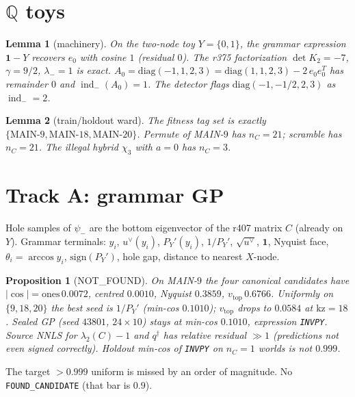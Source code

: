 \documentclass[11pt]{article}
\newtheorem{lemma}{Lemma}
\newtheorem{prop}{Proposition}
\theoremstyle{remark}
\newcommand{\indm}{\operatorname{ind}_{-}}
\newcommand{\Cmat}{C}
\begin{document}
\section{$\mathbb{Q}$ toys}

\begin{lemma}[machinery]\label{lem:q}
On the two-node toy $Y=\{0,1\}$, the grammar expression
$\mathbf{1}-Y$ recovers $e_0$ with cosine $1$ (residual $0$).
The r375 factorization $\det K_2=-7$, $\gamma=9/2$,
$\lambda_-=1$ is exact.
$A_0=\mathrm{diag}(-1,1,2,3)=\mathrm{diag}(1,1,2,3)-2\,e_0e_0^T$
has remainder $0$ and $\indm(A_0)=1$.
The detector flags $\mathrm{diag}(-1,-1/2,2,3)$ as
$\indm=2$.
\end{lemma}

\begin{lemma}[train/holdout ward]\label{lem:split}
The fitness tag set is exactly $\{\mathrm{MAIN}\text{-}9,
\mathrm{MAIN}\text{-}18,\mathrm{MAIN}\text{-}20\}$.
Permute of MAIN-$9$ has $n_C=21$; scramble has $n_C=21$.
The illegal hybrid $\chi_3$ with $a=0$ has $n_C=3$.
\end{lemma}

\section{Track A: grammar GP}

Hole samples of $\psi_-$ are the bottom eigenvector of the
r407 matrix $\Cmat$ (already on $Y$).
Grammar terminals: $y_i$, $u^\vee(y_i)$, $P_Y'(y_i)$,
$1/P_Y'$, $\sqrt{u^\vee}$, $\mathbf{1}$, Nyquist face,
$\theta_i=\arccos y_i$, $\mathrm{sign}(P_Y')$, hole gap,
distance to nearest $X$-node.

\begin{prop}[NOT\_FOUND]\label{prop:a}
On MAIN-$9$ the four canonical candidates have
$|\cos|=\mathrm{ones}\,0.0072$,
centred $0.0010$, Nyquist $0.3859$, $v_{\mathrm{top}}\,0.6766$.
Uniformly on $\{9,18,20\}$ the best seed is $1/P_Y'$
(min-cos $0.1010$); $v_{\mathrm{top}}$ drops to $0.0584$ at
$\mathrm{kz}=18$.
Sealed GP (seed $43801$, $24\times 10$) stays at
min-cos $0.1010$, expression \texttt{INVPY}.
Source NNLS for $\lambda_2(C)-1$ and $q^\dagger$ has
relative residual $\gg 1$ (predictions not even signed
correctly).
Holdout min-cos of \texttt{INVPY} on $n_C=1$ worlds is
not $0.999$.
\end{prop}

The target $>0.999$ uniform is missed by an order of
magnitude.
No \texttt{FOUND\_CANDIDATE} (that bar is $0.9$).
\end{document}
